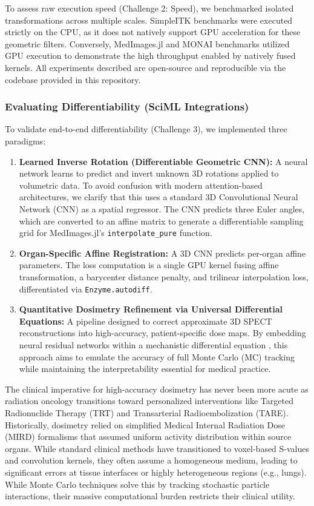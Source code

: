 \documentclass[10pt,letterpaper]{article}
\begin{document}
To assess raw execution speed (Challenge 2: Speed), we benchmarked isolated transformations across multiple scales. SimpleITK benchmarks were executed strictly on the CPU, as it does not natively support GPU acceleration for these geometric filters. Conversely, MedImages.jl and MONAI benchmarks utilized GPU execution to demonstrate the high throughput enabled by natively fused kernels. All experiments described are open-source and reproducible via the codebase provided in this repository.

\subsubsection*{Evaluating Differentiability (SciML Integrations)}
To validate end-to-end differentiability (Challenge 3), we implemented three paradigms:
\begin{enumerate}
    \item \textbf{Learned Inverse Rotation (Differentiable Geometric CNN):} A neural network learns to predict and invert unknown 3D rotations applied to volumetric data. To avoid confusion with modern attention-based architectures, we clarify that this uses a standard 3D Convolutional Neural Network (CNN) as a spatial regressor. The CNN predicts three Euler angles, which are converted to an affine matrix to generate a differentiable sampling grid for MedImages.jl's \texttt{interpolate\_pure} function. 
    \item \textbf{Organ-Specific Affine Registration:} A 3D CNN predicts per-organ affine parameters. The loss computation is a single GPU kernel fusing affine transformation, a barycenter distance penalty, and trilinear interpolation loss, differentiated via \texttt{Enzyme.autodiff}.
    \item \textbf{Quantitative Dosimetry Refinement via Universal Differential Equations:} A pipeline designed to correct approximate 3D SPECT reconstructions into high-accuracy, patient-specific dose maps. By embedding neural residual networks within a mechanistic differential equation \cite{Berman_2024}, this approach aims to emulate the accuracy of full Monte Carlo (MC) tracking while maintaining the interpretability essential for medical practice.
\end{enumerate}

The clinical imperative for high-accuracy dosimetry has never been more acute as radiation oncology transitions toward personalized interventions like Targeted Radionuclide Therapy (TRT) and Transarterial Radioembolization (TARE). Historically, dosimetry relied on simplified Medical Internal Radiation Dose (MIRD) formalisms that assumed uniform activity distribution within source organs. While standard clinical methods have transitioned to voxel-based S-values and convolution kernels, they often assume a homogeneous medium, leading to significant errors at tissue interfaces or highly heterogeneous regions (e.g., lungs). While Monte Carlo techniques solve this by tracking stochastic particle interactions, their massive computational burden restricts their clinical utility.
\end{document}
